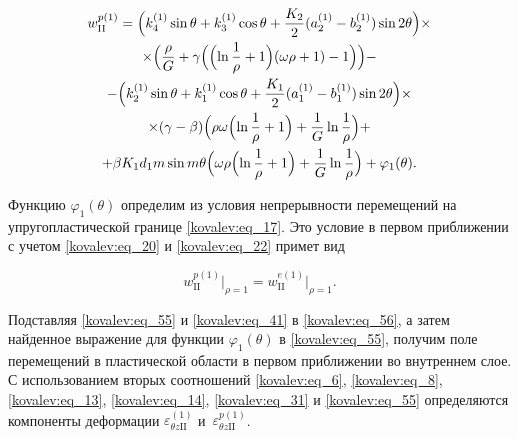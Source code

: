  \begin{multline}

\label{kovalev:eq_55}

w_{\mathrm{II}}^{p(1)}=

\Bigl(k_4^{(1)}\sin\theta+k_3^{(1)}\cos\theta+\frac{K_2}{2}(a_2^{(1)}-b_2^{(1)})\sin2\theta\Bigr)\times\\

\times \Bigl(\frac{\rho}{G}+\gamma\Bigl(\Bigl(\ln\frac1{\rho}+1\Bigr)(\omega\rho+1)-1\Bigr)\Bigr)-\\

-\Bigl(k_2^{(1)}\sin\theta+k_1^{(1)}\cos\theta+\frac{K_1}{2}

(a_1^{(1)}-b_1^{(1)})\sin2\theta\Bigr) \times\\

\times

(\gamma-\beta)\Bigl(\rho\omega\Bigl(\ln\frac1{\rho}+1\Bigr)+\frac1{G}\ln\dfrac1{\rho}\Bigr)+\\

  +\beta K_1d_1m \sin m\theta

  \Bigl(\omega\rho\Bigl(\ln\frac1{\rho}+1\Bigr)+\frac1{G}\ln\frac1{\rho}\Bigr)+\varphi_1(\theta).

 \end{multline}



Функцию $\varphi_1(\theta)$ определим из условия непрерывности перемещений на упругопластической границе \eqref{kovalev:eq_17}. Это условие в первом приближении с учетом \eqref{kovalev:eq_20} и \eqref{kovalev:eq_22} примет вид

 \begin{equation}\label{kovalev:eq_56}

w_{\mathrm{II}}^{p(1)}\bigr|_{\rho=1}= w_{\mathrm{II}}^{e(1)}\bigr|_{\rho=1}.

 \end{equation}



Подставляя \eqref{kovalev:eq_55} и \eqref{kovalev:eq_41} в \eqref{kovalev:eq_56}, а затем найденное выражение для функции $\varphi_1(\theta)$  в \eqref{kovalev:eq_55}, получим поле перемещений в пластической области в первом приближении во внутреннем слое. С использованием вторых соотношений \eqref{kovalev:eq_6}, \eqref{kovalev:eq_8}, \eqref{kovalev:eq_13}, \eqref{kovalev:eq_14}, \eqref{kovalev:eq_31} и \eqref{kovalev:eq_55} определяются компоненты деформации $\varepsilon_{\theta z\mathrm{II}}^{(1)}$  и~$\varepsilon_{\theta z\mathrm{II}}^{p(1)}$.



